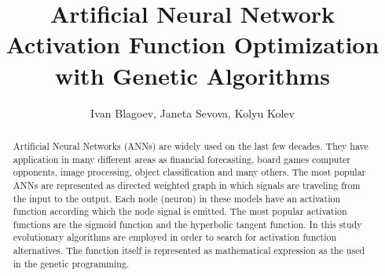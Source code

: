 \documentclass{llncs}
\begin{document}
\title{Artificial Neural Network Activation Function Optimization with Genetic Algorithms}

\author{Ivan Blagoev, Janeta Sevova, Kolyu Kolev}



\maketitle


\begin{abstract}
Artificial Neural Networks (ANNs) are widely used on the last few decades. They have application in many different areas as financial forecasting, board games computer opponents, image processing, object classification and many others. The most popular ANNs are represented as directed weighted graph in which signals are traveling from the input to the output. Each node (neuron) in these models have an activation function according which the node signal is emitted. The most popular activation functions are the sigmoid function and the hyperbolic tangent function. In this study evolutionary algorithms are employed in order to search for activation function alternatives. The function itself is represented as mathematical expression as the used in the genetic programming.

\end{abstract}

\end{document}
